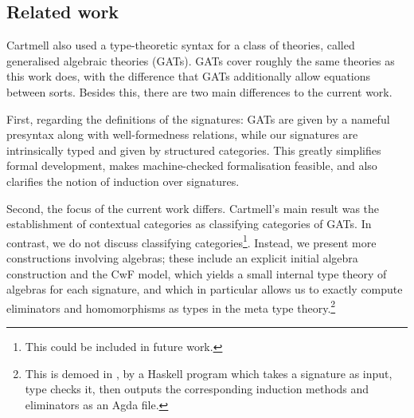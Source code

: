 \documentclass[acmsmall,review]{acmart}\settopmatter{printfolios=true,printccs=false,printacmref=false}
\begin{document}

\subsection{Related work}
\label{sec:related-work}

Cartmell \cite{gat} also used a type-theoretic syntax for a class of
theories, called generalised algebraic theories (GATs). GATs cover
roughly the same theories as this work does, with the difference that
GATs additionally allow equations between sorts. Besides this, there
are two main differences to the current work.

First, regarding the definitions of the signatures: GATs are given by
a nameful presyntax along with well-formedness relations, while our
signatures are intrinsically typed and given by structured
categories. This greatly simplifies formal development, makes
machine-checked formalisation feasible, and also clarifies the notion
of induction over signatures.

Second, the focus of the current work differs. Cartmell's main result
was the establishment of contextual categories as classifying
categories of GATs. In contrast, we do not discuss classifying
categories\footnote{This could be included in future work.}. Instead,
we present more constructions involving algebras; these include an
explicit initial algebra construction and the CwF model, which yields
a small internal type theory of algebras for each signature, and which
in particular allows us to exactly compute eliminators and
homomorphisms as types in the meta type theory.\footnote{This is
demoed in \cite{kaposi_et_al:LIPIcs:2018:9190}, by a Haskell program which
takes a signature as input, type checks it, then outputs the
corresponding induction methods and eliminators as an Agda file.}
\end{document}
